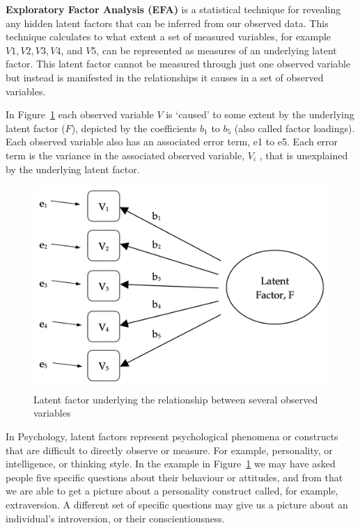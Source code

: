\documentclass[
  a4paper,
]{book}
\begin{document}
\textbf{Exploratory Factor Analysis (EFA)} is a statistical technique
for revealing any hidden latent factors that can be inferred from our
observed data. This technique calculates to what extent a set of
measured variables, for example \(V1, V2, V3, V4\), and \(V5\), can be
represented as measures of an underlying latent factor. This latent
factor cannot be measured through just one observed variable but instead
is manifested in the relationships it causes in a set of observed
variables.

In Figure~\ref{fig-fig15-1} each observed variable \(V\) is `caused' to
some extent by the underlying latent factor (\(F\)), depicted by the
coefficients \(b_1\) to \(b_5\) (also called factor loadings). Each
observed variable also has an associated error term, e1 to e5. Each
error term is the variance in the associated observed variable, \(V_i\)
, that is unexplained by the underlying latent factor.

\begin{figure}

\includegraphics[width=1\textwidth,height=\textheight]{images/fig15-1.png} \hfill{}

\caption{\label{fig-fig15-1}Latent factor underlying the relationship
between several observed variables}

\end{figure}

In Psychology, latent factors represent psychological phenomena or
constructs that are difficult to directly observe or measure. For
example, personality, or intelligence, or thinking style. In the example
in Figure~\ref{fig-fig15-1} we may have asked people five specific
questions about their behaviour or attitudes, and from that we are able
to get a picture about a personality construct called, for example,
extraversion. A different set of specific questions may give us a
picture about an individual's introversion, or their conscientiousness.
\end{document}
